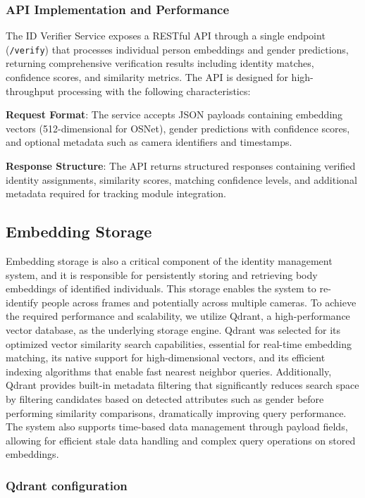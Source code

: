 \subsubsection{API Implementation and Performance}

The ID Verifier Service exposes a RESTful API through a single endpoint (\texttt{/verify}) that processes individual person embeddings and gender predictions, returning comprehensive verification results including identity matches, confidence scores, and similarity metrics. The API is designed for high-throughput processing with the following characteristics:

\textbf{Request Format}: The service accepts JSON payloads containing embedding vectors (512-dimensional for OSNet), gender predictions with confidence scores, and optional metadata such as camera identifiers and timestamps.

\textbf{Response Structure}: The API returns structured responses containing verified identity assignments, similarity scores, matching confidence levels, and additional metadata required for tracking module integration.

\subsection{Embedding Storage}

Embedding storage is also a critical component of the identity management system, and it is responsible for persistently storing and retrieving body embeddings of identified individuals. This storage enables the system to re-identify people across frames and potentially across multiple cameras. To achieve the required performance and scalability, we utilize Qdrant, a high-performance vector database, as the underlying storage engine. Qdrant was selected for its optimized vector similarity search capabilities, essential for real-time embedding matching, its native support for high-dimensional vectors, and its efficient indexing algorithms that enable fast nearest neighbor queries. Additionally, Qdrant provides built-in metadata filtering that significantly reduces search space by filtering candidates based on detected attributes such as gender before performing similarity comparisons, dramatically improving query performance. The system also supports time-based data management through payload fields, allowing for efficient stale data handling and complex query operations on stored embeddings.

\subsubsection{Qdrant configuration}

